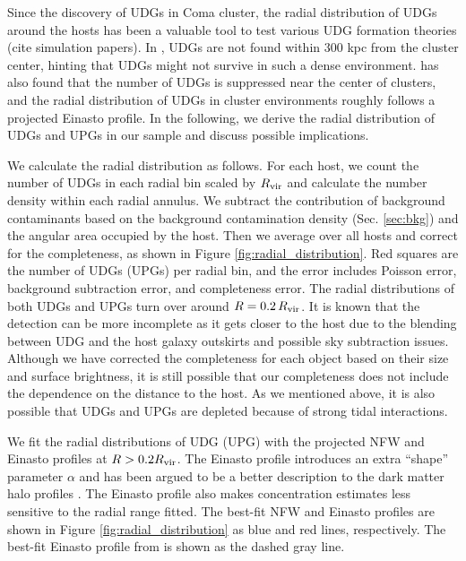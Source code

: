 \documentclass[twocolumn,astrosymb,twocolappendix]{aastex631}
\begin{document}
\begin{CJK*}{UTF8}{gbsn}
Since the discovery of UDGs in Coma cluster, the radial distribution of UDGs around the hosts has been a valuable tool to test various UDG formation theories (cite simulation papers). In \citet{vanDokkum2015}, UDGs are not found within 300 kpc from the cluster center, hinting that UDGs might not survive in such a dense environment. \citet{vdBurg2016} has also found that the number of UDGs is suppressed near the center of clusters, and the radial distribution of UDGs in cluster environments roughly follows a projected Einasto \citep{Einasto1965} profile. In the following, we derive the radial distribution of UDGs and UPGs in our sample and discuss possible implications.

We calculate the radial distribution as follows. For each host, we count the number of UDGs in each radial bin scaled by $R_{\rm vir}$ and calculate the number density within each radial annulus. We subtract the contribution of background contaminants based on the background contamination density (Sec. \ref{sec:bkg}) and the angular area occupied by the host. Then we average over all hosts and correct for the completeness, as shown in Figure \ref{fig:radial_distribution}. Red squares are the number of UDGs (UPGs) per radial bin, and the error includes Poisson error, background subtraction error, and completeness error. The radial distributions of both UDGs and UPGs turn over around $R=0.2\,R_{\rm vir}$. It is known that the detection can be more incomplete as it gets closer to the host due to the blending between UDG and the host galaxy outskirts and possible sky subtraction issues. Although we have corrected the completeness for each object based on their size and surface brightness, it is still possible that our completeness does not include the dependence on the distance to the host. As we mentioned above, it is also possible that UDGs and UPGs are depleted because of strong tidal interactions. 

We fit the radial distributions of UDG (UPG) with the projected NFW and Einasto profiles at $R > 0.2 R_{\rm vir}$. The Einasto profile introduces an extra ``shape'' parameter $\alpha$ and has been argued to be a better description to the dark matter halo profiles \citep[e.g.,][]{Navarro2004,Gao2008,Navarro2010,Dutton2014}. The Einasto profile also makes concentration estimates less sensitive to the radial range fitted. The best-fit NFW and Einasto profiles are shown in Figure \ref{fig:radial_distribution} as blue and red lines, respectively. The best-fit Einasto profile from \citet{vdBurg2016} is shown as the dashed gray line.


\end{CJK*}
\end{document}
